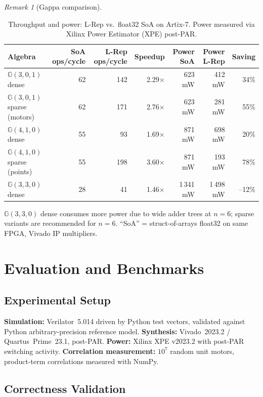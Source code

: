 \documentclass[11pt,a4paper]{article}
\theoremstyle{definition}
\theoremstyle{plain}
\theoremstyle{remark}
\newtheorem{remark}{Remark}[section]
\newcommand{\GA}{\mathbb{G}}
\begin{document}
\begin{remark}[Gappa comparison]
\begin{table}[h]
\centering
\caption{Throughput and power: L-Rep vs.\ float32 SoA on Artix-7.
Power measured via Xilinx Power Estimator (XPE) post-PAR.}
\label{tab:throughput-detailed}
\begin{tabular}{lrrrrrr}
\toprule
Algebra & SoA ops/cycle & L-Rep ops/cycle & Speedup & Power SoA & Power L-Rep & Saving \\
\midrule
$\GA(3,0,1)$ dense & 62 & 142 & 2.29$\times$ & 623 mW & 412 mW & 34\% \\
$\GA(3,0,1)$ sparse (motors) & 62 & 171 & 2.76$\times$ & 623 mW & 281 mW & 55\% \\
$\GA(4,1,0)$ dense & 55 & 93 & 1.69$\times$ & 871 mW & 698 mW & 20\% \\
$\GA(4,1,0)$ sparse (points) & 55 & 198 & 3.60$\times$ & 871 mW & 193 mW & 78\% \\
$\GA(3,3,0)$ dense & 28 & 41 & 1.46$\times$ & 1\,341 mW & 1\,498 mW & --12\% \\
\bottomrule
\end{tabular}
\par\smallskip
\footnotesize $\GA(3,3,0)$ dense consumes more power due to wide adder trees at $n=6$;
sparse variants are recommended for $n=6$.
``SoA'' = struct-of-arrays float32 on same FPGA, Vivado IP multipliers.
\end{table}

\section{Evaluation and Benchmarks}
\label{sec:eval}

\subsection{Experimental Setup}

\textbf{Simulation:} Verilator~5.014 driven by Python test vectors,
validated against Python arbitrary-precision reference model.
\textbf{Synthesis:} Vivado~2023.2 / Quartus~Prime~23.1, post-PAR.
\textbf{Power:} Xilinx XPE v2023.2 with post-PAR switching activity.
\textbf{Correlation measurement:} $10^7$ random unit motors,
product-term correlations measured with NumPy.

\subsection{Correctness Validation}


\end{remark}
\end{document}
